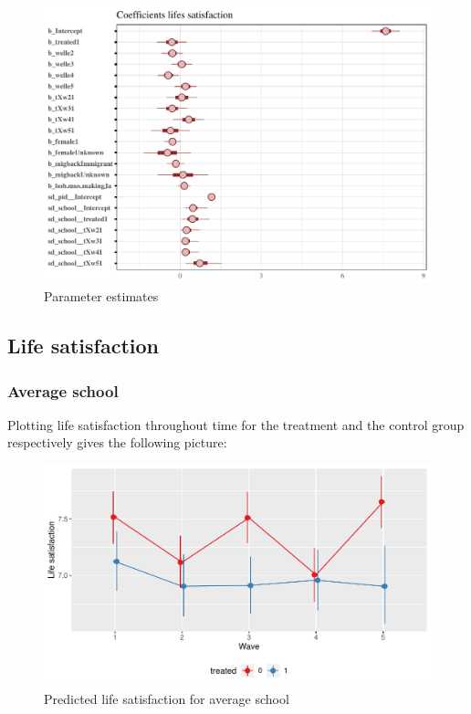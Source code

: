 \documentclass[a4, 12pt]{article}
\begin{document}
\begin{figure}[H]

{\centering \includegraphics[width=0.8\linewidth,]{../figures/m1_coef} 

}

\caption{Parameter estimates}\label{fig:m1-coef}
\end{figure}

\hypertarget{life-satisfaction}{%
\subsection{Life satisfaction}\label{life-satisfaction}}

\label{sec:life-satisfaction}

\hypertarget{average-school}{%
\subsubsection{Average school}\label{average-school}}

Plotting life satisfaction throughout time for the treatment and the control group respectively gives the following picture:

\begin{figure}[H]

{\centering \includegraphics[width=0.8\linewidth,]{../figures/lsat_pred} 

}

\caption{Predicted life satisfaction for average school}\label{fig:lsat-pred}
\end{figure}
\end{document}

